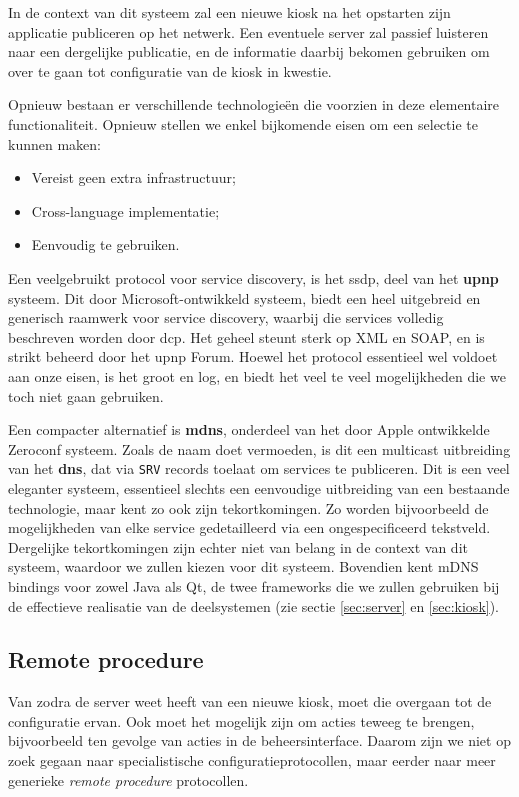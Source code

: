 In de context van dit systeem zal een nieuwe kiosk na het opstarten zijn applicatie publiceren op het netwerk. Een eventuele server zal passief luisteren naar een dergelijke publicatie, en de informatie daarbij bekomen gebruiken om over te gaan tot configuratie van de kiosk in kwestie.

Opnieuw bestaan er verschillende technologieën die voorzien in deze elementaire functionaliteit. Opnieuw stellen we enkel bijkomende eisen om een selectie te kunnen maken:
\begin{itemize}
\item Vereist geen extra infrastructuur;
\item Cross-language implementatie;
\item Eenvoudig te gebruiken.
\end{itemize}

Een veelgebruikt protocol voor service discovery, is het \ac{ssdp}, deel van het \textbf{\ac{upnp}} systeem. Dit door Microsoft-ontwikkeld systeem, biedt een heel uitgebreid en generisch raamwerk voor service discovery, waarbij die services volledig beschreven worden door \ac{dcp}. Het geheel steunt sterk op XML en SOAP, en is strikt beheerd door het \ac{upnp} Forum. Hoewel het protocol essentieel wel voldoet aan onze eisen, is het groot en log, en biedt het veel te veel mogelijkheden die we toch niet gaan gebruiken.

Een compacter alternatief is \textbf{\ac{mdns}}, onderdeel van het door Apple ontwikkelde Zeroconf systeem. Zoals de naam doet vermoeden, is dit een multicast uitbreiding van het \textbf{\ac{dns}}, dat via \texttt{SRV} records toelaat om services te publiceren. Dit is een veel eleganter systeem, essentieel slechts een eenvoudige uitbreiding van een bestaande technologie, maar kent zo ook zijn tekortkomingen. Zo worden bijvoorbeeld de mogelijkheden van elke service gedetailleerd via een ongespecificeerd tekstveld. Dergelijke tekortkomingen zijn echter niet van belang in de context van dit systeem, waardoor we zullen kiezen voor dit systeem. Bovendien kent mDNS bindings voor zowel Java als Qt, de twee frameworks die we zullen gebruiken bij de effectieve realisatie van de deelsystemen (zie sectie \ref{sec:server} en \ref{sec:kiosk}).

\subsection{Remote procedure}

Van zodra de server weet heeft van een nieuwe kiosk, moet die overgaan tot de configuratie ervan. Ook moet het mogelijk zijn om acties teweeg te brengen, bijvoorbeeld ten gevolge van acties in de beheersinterface. Daarom zijn we niet op zoek gegaan naar specialistische configuratieprotocollen, maar eerder naar meer generieke \emph{remote procedure} protocollen.

